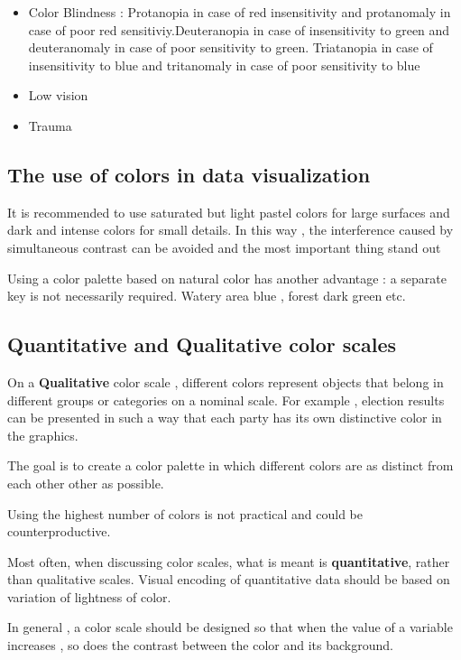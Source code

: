 \documentclass{article}
\begin{document}
\begin{itemize}
    \item Color Blindness : Protanopia in case of red insensitivity and protanomaly in case of poor red sensitiviy.Deuteranopia in case of insensitivity to green and deuteranomaly in case of poor sensitivity to green. Triatanopia in case of insensitivity to blue and tritanomaly in case of poor sensitivity to blue
    \item Low vision
    \item Trauma
    
\end{itemize}

\subsection{The use of colors in data visualization}

It is recommended to use saturated but light pastel colors for large surfaces and dark and intense colors for small details. In this way , the interference caused by simultaneous contrast can be avoided and the most important thing stand out

Using a color palette based on natural color has another advantage : a separate key is not necessarily required.
Watery area blue , forest dark green etc.

\subsection{Quantitative and Qualitative color scales}

On a \textbf{Qualitative} color scale , different colors represent objects that belong in different groups or categories on a nominal scale. For example , election results can be presented in such a way that each party has its own distinctive color in the graphics.

The goal is to create a color palette in which different colors are as distinct from each other other as possible.

Using the highest number of colors is not practical and could be counterproductive.

Most often, when discussing color scales, what is meant is \textbf{quantitative}, rather than qualitative scales.
Visual encoding of quantitative data should be based on variation of lightness of color.

In general , a color scale should be designed so that when the value of a variable increases , so does the contrast between the color and its background.
\end{document}
